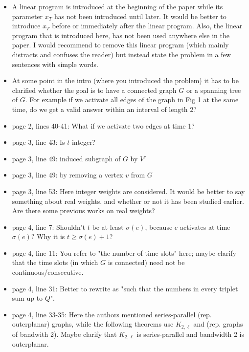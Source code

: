 \documentclass[11pt,a4paper]{article}
\begin{document}
\begin{itemize}

\item A linear program is introduced at the beginning of the paper while its parameter $x_T$ has not been introduced until later. It would be better to introduce $x_T$ before or immediately after the linear program. 
Also, the linear program that is introduced here, has not been used anywhere else in the paper. I would recommend to remove this linear program (which mainly distracts and confuses the reader) but instead state the problem in a few sentences with simple words.

\item At some point in the intro (where you introduced the problem) it has to be clarified whether the goal is to have a connected graph $G$ or a spanning tree of $G$. For example if we activate all edges of the graph in Fig 1 at the same time, do we get a valid answer within an interval of length 2? 

\item page 2, lines 40-41: What if we activate two edges at time 1?

\item page 3, line 43: Is $t$ integer?

\item page 3, line 49: induced subgraph of $G$ by $V'$

\item page 3, line 49: by removing a vertex $v$ from $G$

\item page 3, line 53: Here integer weights are considered. It would be better to say something about real weights, and whether or not it has been studied earlier. Are there some previous works on real weights?

\item page 4, line 7: Shouldn't $t$ be at least $\sigma(e)$, because $e$ activates at time $\sigma(e)$? Why it is $t \geq \sigma(e)+1$?

\item page 4, line 11: You refer to "the number of time slots" here; maybe clarify that the time slots (in which $G$ is connected) need not be continuous/consecutive.

\item page 4, line 31: Better to rewrite as "such that the numbers in every triplet sum up to $Q$".

\item page 4, line 33-35: Here the authors mentioned series-parallel (rep. outerplanar) graphs, while the following theorems use $K_{2,\ell}$ and (rep. graphs of bandwith 2). Maybe clarify that $K_{2,\ell}$ is series-parallel and bandwidth 2 is outerplanar.


\end{itemize}
\end{document}

